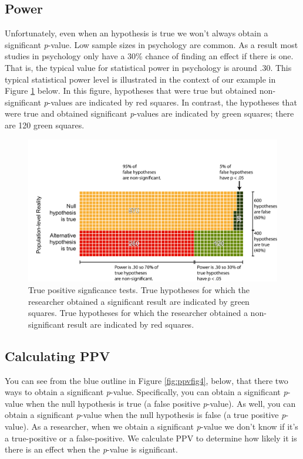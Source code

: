 \documentclass[
]{krantz}
\begin{document}
\hypertarget{power}{%
\subsection{Power}\label{power}}

Unfortunately, even when an hypothesis is true we won't always obtain a significant \emph{p}-value. Low sample sizes in psychology are common. As a result most studies in psychology only have a 30\% chance of finding an effect if there is one. That is, the typical value for statistical power in psychology is around .30. This typical statistical power level is illustrated in the context of our example in Figure \ref{fig:ppvfig3} below. In this figure, hypotheses that were true but obtained non-significant \emph{p}-values are indicated by red squares. In contrast, the hypotheses that were true and obtained significant \emph{p}-values are indicated by green squares; there are 120 green squares.

\begin{figure}
\includegraphics[width=0.9\linewidth]{ch_ppv/images/fig3} \caption[True positive signficance tests.]{True positive signficance tests. True hypotheses for which the researcher obtained a significant result are indicated by green squares. True hypotheses for which the researcher obtained a non-significant result are indicated by red squares.}\label{fig:ppvfig3}
\end{figure}

\hypertarget{calculating-ppv}{%
\subsection{Calculating PPV}\label{calculating-ppv}}

You can see from the blue outline in Figure \ref{fig:ppvfig4}, below, that there two ways to obtain a significant \emph{p}-value. Specifically, you can obtain a significant \emph{p}-value when the null hypothesis is true (a false positive \emph{p}-value). As well, you can obtain a significant \emph{p}-value when the null hypothesis is false (a true positive \emph{p}-value). As a researcher, when we obtain a significant \emph{p}-value we don't know if it's a true-positive or a false-positive. We calculate PPV to determine how likely it is there is an effect when the \emph{p}-value is significant.
\end{document}
